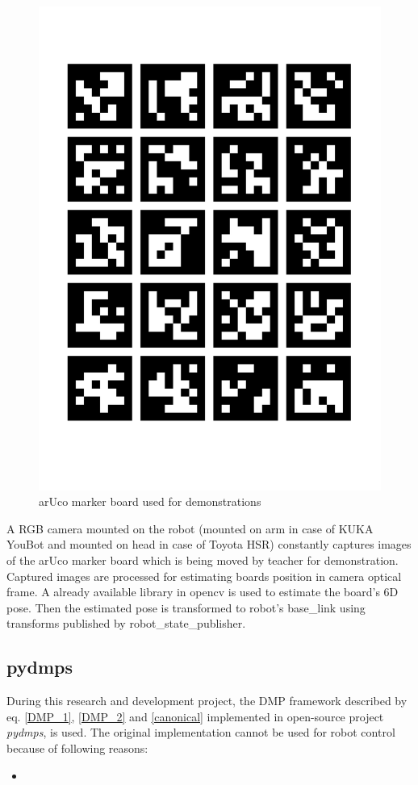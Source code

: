 \begin{figure}[H]
	\centering
	\includegraphics[scale=0.3]{images/aruco_marker_board.pdf}
	\caption{arUco marker board used for demonstrations}
	\label{fig:aruco_marker_board}
\end{figure}

A RGB camera mounted on the robot (mounted on arm in case of KUKA YouBot and mounted on head in case of Toyota HSR) constantly captures images of the arUco marker board which is being moved by teacher for demonstration. Captured images are processed for estimating boards position in camera optical frame. A already available library in opencv is used to estimate the board's 6D pose. Then the estimated pose is transformed to robot's base\_link using transforms published by robot\_state\_publisher. 

\subsection{pydmps}

During this research and development project, the DMP framework described by eq. \ref{DMP_1}, \ref{DMP_2} and \ref{canonical} implemented in open-source project \textit{pydmps}\cite{pydmps}, is used. The original implementation cannot be used for robot control because of following reasons: 
\begin{itemize}
	\item 
\end{itemize} 
